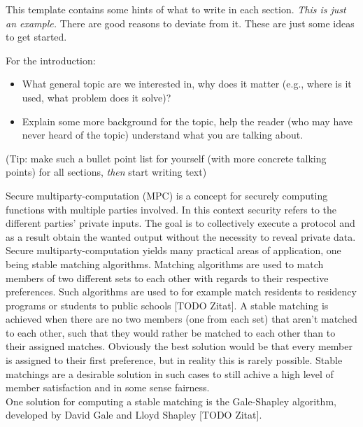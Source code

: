 This template contains some hints of what to write in each section.
\emph{This is just an example.} There are good reasons to deviate from it. These are just some ideas to get started. 

For the introduction:
\begin{itemize}
  \item What general topic are we interested in, why does it matter (e.g., where is it used, what problem does it solve)?
  \item Explain some more background for the topic, help the reader (who may have never heard of the topic) understand what you are talking about.
\end{itemize}
(Tip: make such a bullet point list for yourself (with more concrete talking points) for all sections, \emph{then} start writing text)

Secure multiparty-computation (MPC) is a concept for securely computing functions with multiple parties involved. In this context security refers to the different parties' private inputs. The goal is to collectively execute a protocol and as a result obtain the wanted output without the necessity to reveal private data. \\
Secure multiparty-computation yields many practical areas of application, one being stable matching algorithms. Matching algorithms are used to match members of two different sets to each other with regards to their respective preferences. Such algorithms are used to for example match residents to residency programs or students to public schools [TODO Zitat]. A stable matching is achieved when there are no two members (one from each set) that aren't matched to each other, such that they would rather be matched to each other than to their assigned matches. Obviously the best solution would be that every member is assigned to their first preference, but in reality this is rarely possible. Stable matchings are a desirable solution in such cases to still achive a high level of member satisfaction and in some sense fairness.\\
One solution for computing a stable matching is the Gale-Shapley algorithm, developed by David Gale and Lloyd Shapley [TODO Zitat].  